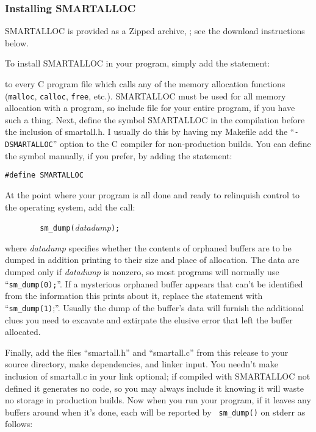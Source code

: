\subsubsection*{ Installing SMARTALLOC}

SMARTALLOC is provided as a Zipped archive, 
; see the
download instructions below. 

To install SMARTALLOC in your program, simply add the statement: 

to every C program file which calls any of the memory allocation functions
({\tt malloc}, {\tt calloc}, {\tt free}, etc.). SMARTALLOC must be used for
all memory allocation with a program, so include file for your entire program,
if you have such a thing. Next, define the symbol SMARTALLOC in the
compilation before the inclusion of smartall.h. I usually do this by having my
Makefile add the ``{\tt -DSMARTALLOC}'' option to the C compiler for
non-production builds. You can define the symbol manually, if you prefer, by
adding the statement: 

{\tt \#define SMARTALLOC} 

At the point where your program is all done and ready to relinquish control to
the operating system, add the call: 

{\tt \ \ \ \ \ \ \ \ sm\_dump(}{\it datadump}{\tt );} 

where {\it datadump} specifies whether the contents of orphaned buffers are to
be dumped in addition printing to their size and place of allocation. The data
are dumped only if {\it datadump} is nonzero, so most programs will normally
use ``{\tt sm\_dump(0);}''. If a mysterious orphaned buffer appears that can't
be identified from the information this prints about it, replace the statement
with ``{\tt sm\_dump(1)};''. Usually the dump of the buffer's data will
furnish the additional clues you need to excavate and extirpate the elusive
error that left the buffer allocated. 

Finally, add the files ``smartall.h'' and ``smartall.c'' from this release to
your source directory, make dependencies, and linker input. You needn't make
inclusion of smartall.c in your link optional; if compiled with SMARTALLOC not
defined it generates no code, so you may always include it knowing it will
waste no storage in production builds. Now when you run your program, if it
leaves any buffers around when it's done, each will be reported by {\tt
sm\_dump()} on stderr as follows: 

